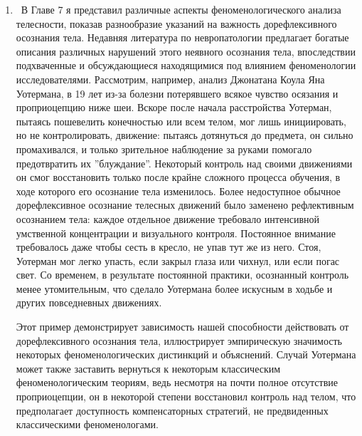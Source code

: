\documentclass[11pt]{book}
\begin{document}
\begin{enumerate}

  \item\ В Главе 7 я представил различные аспекты феноменологического анализа телесности, показав разнообразие указаний на важность дорефлексивного осознания тела. Недавняя литература по невропатологии предлагает богатые описания различных нарушений этого неявного осознания тела, впоследствии подхваченные и обсуждающиеся находящимися под влиянием феноменологии исследователями. Рассмотрим, например, анализ Джонатана Коула Яна Уотермана, в 19 лет из-за болезни потерявшего всякое чувство осязания и проприоцепцию ниже шеи. Вскоре после начала расстройства Уотерман, пытаясь пошевелить конечностью или всем телом, мог лишь инициировать, но не контролировать, движение: пытаясь дотянуться до предмета, он сильно промахивался, и только зрительное наблюдение за руками помогало предотвратить их ''блуждание''. Некоторый контроль над своими движениями он смог восстановить только после крайне сложного процесса обучения, в ходе которого его осознание тела изменилось. Более недоступное обычное дорефлексивное осознание телесных движений было заменено рефлективным осознанием тела: каждое отдельное движение требовало интенсивной умственной концентрации и визуального контроля. Постоянное внимание требовалось даже чтобы сесть в кресло, не упав тут же из него. Стоя, Уотерман мог легко упасть, если закрыл глаза или чихнул, или если погас свет. Со временем, в результате постоянной практики, осознанный контроль менее утомительным, что сделало Уотермана более искусным в ходьбе и других повседневных движениях.

Этот пример демонстрирует зависимость нашей способности действовать от дорефлексивного осознания тела, иллюстрирует эмпирическую значимость некоторых феноменологических дистинкций и объяснений. Случай Уотермана может также заставить вернуться к некоторым классическим феноменологическим теориям, ведь несмотря на почти полное отсутствие проприоцепции, он в некоторой степени восстановил контроль над телом, что предполагает доступность компенсаторных стратегий, не предвиденных классическими феноменологами.


\end{enumerate}
\end{document}
